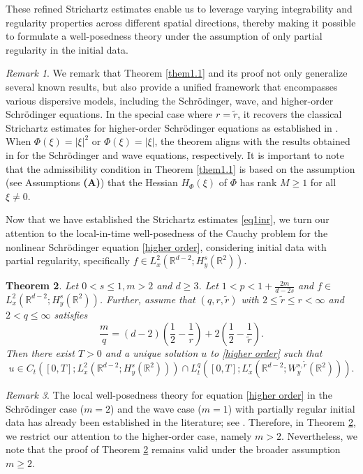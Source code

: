 \documentclass[a4paper,11pt, reqno]{amsart}
\newtheorem{theorem}{Theorem}[section]
\theoremstyle{definition}
\theoremstyle{remark}
\newtheorem{rem}[theorem]{Remark}
\numberwithin{equation}{section}
\begin{document}
    These refined Strichartz estimates enable us to leverage varying integrability and regularity properties across different spatial directions, thereby making it possible to formulate a well-posedness theory under the assumption of only partial regularity in the initial data.

	
		\begin{rem} We remark that Theorem \ref{them1.1} and its proof not only generalize several known results, but also provide a unified framework that encompasses various dispersive models, including the Schr\"odinger, wave, and higher-order Schr\"odinger equations.
 In the special case where $r = \tilde{r}$, it recovers the classical Strichartz estimates for higher-order Schr\"odinger equations as established in \cite{CHL11}. When $\Phi(\xi) = |\xi|^2$ or $\Phi(\xi) = |\xi|$, the theorem aligns with the results obtained in \cite{KLS23} for the Schr\"odinger and wave equations, respectively. It is important to note that the admissibility condition in Theorem \ref{them1.1} is based on the assumption (see Assumptions {\bf (A)}) that the Hessian $H_{\Phi}(\xi)$ of $\Phi$ has rank $M \geq 1$ for all $\xi \neq 0$.
\end{rem}

Now that we have established the Strichartz estimates \eqref{eq1inr}, we turn our attention to the local-in-time well-posedness of the Cauchy problem for the nonlinear Schrödinger equation \eqref{higher order}, considering initial data with partial regularity, specifically $f \in L_x^2\left(\mathbb{R}^{d-2} ; H_y^s\left(\mathbb{R}^2\right)\right)$.
	\begin{theorem} \label{thmintowel}
		Let   $0<s \leq 1, m>2$ and $d \geq 3$.  Let   $1<p<1+\frac{2m}{ d-2s}$ and $f \in$ $L_x^2\left(\mathbb{R}^{d-2} ; H_y^s\left(\mathbb{R}^2\right)\right)$.  Further, assume that  
		$(q, r, \tilde{r})$ with $2 \leq \widetilde{r} \leq r<\infty$ and $ 2<q \leq \infty $ satisfies $$			\frac{{{m}}}{q}=(d-2)\left(\frac{1}{2}-\frac{1}{r}\right)+2\left(\frac{1}{2}-\frac{1}{\widetilde{r}}\right).$$ Then there exist  $T>0$ and a unique solution $u$ to \eqref{higher order} such that 
		$$
		u \in C_t\left([0, T] ;L_x^2\left(\mathbb{R}^{d-2} ; H_y^s\left(\mathbb{R}^2\right)\right)\right) \cap L_t^q\left([0, T] ; L_x^r \left(\mathbb{R}^{d-2}; W_y^{s, \widetilde{r}}(\mathbb{R}^{2})\right)\right).
		$$
		\end{theorem}
        \begin{rem}

        The local well-posedness theory for equation \eqref{higher order} in the Schr\"odinger case ($m = 2$) and the wave case ($m = 1$) with partially regular initial data has already been established in the literature; see \cite{KLS23}. Therefore, in Theorem \ref{thmintowel}, we restrict our attention to the higher-order case, namely $m > 2$. Nevertheless, we note that the proof of Theorem \ref{thmintowel} remains valid under the broader assumption $m \geq 2$.
        \end{rem}
\end{document}
